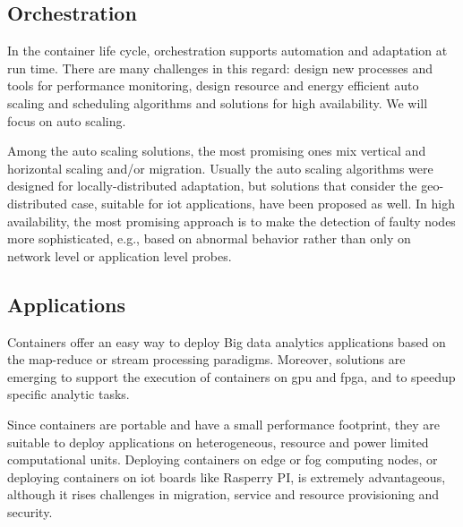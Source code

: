 \subsection{Orchestration}

In the container life cycle, orchestration supports automation and adaptation at run time. There are many challenges in this regard: design new processes and tools for performance monitoring, design resource and energy efficient auto scaling and scheduling algorithms and solutions for high availability. We will focus on auto scaling.

Among the auto scaling solutions, the most promising ones mix vertical and horizontal scaling and/or migration. Usually the auto scaling algorithms were designed for locally-distributed adaptation, but solutions that consider the geo-distributed case, suitable for \gls{iot} applications, have been
proposed as well. In high availability, the most promising approach is to make the detection of faulty nodes more sophisticated, e.g., based on abnormal behavior rather than only on network level or application level probes.~\cite{containersStateOfArt}

\subsection{Applications}

Containers offer an easy way to deploy Big data analytics applications based on the map-reduce or stream processing paradigms. Moreover, solutions are emerging to support the execution of containers on \gls{gpu} and \gls{fpga}, and to speedup specific analytic tasks.

Since containers are portable and have a small performance footprint, they are suitable to deploy applications on heterogeneous, resource and power limited computational units. Deploying containers on edge or fog computing nodes, or deploying containers on \gls{iot} boards like Rasperry
PI, is extremely advantageous, although it rises challenges in migration, service and resource provisioning and security.~\cite{containersStateOfArt}


